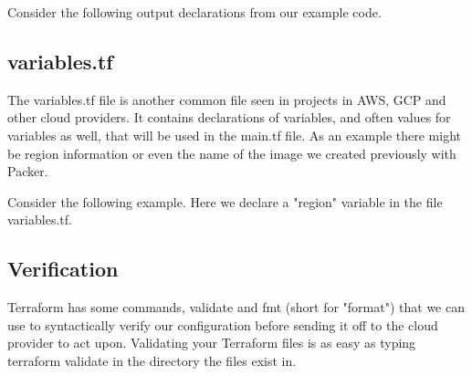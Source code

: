 \justify
Consider the following output declarations from our example code.

\begin{Shaded}
   \begin{Highlighting}[]
       \NormalTok{ \{}
      \NormalTok{ = }
      \NormalTok{\}}

       \NormalTok{ \{}
      \NormalTok{ = }
      \NormalTok{\}}
   \end{Highlighting}
\end{Shaded}


\subsection{variables.tf}

\justify
The variables.tf file is another common file seen in projects in AWS,
GCP and other cloud providers. It contains declarations of variables,
and often values for variables as well, that will be used in the main.tf
file. As an example there might be region information or even the name
of the image we created previously with Packer.

\justify
Consider the following example. Here we declare a "region" variable in
the file variables.tf.

\begin{Shaded}
   \begin{Highlighting}[]
       \NormalTok{ \{}
      \NormalTok{ = }
      \NormalTok{     = }
      \NormalTok{\}}
   \end{Highlighting}
\end{Shaded}


\subsection{Verification}

\justify
Terraform has some commands, validate and fmt (short for "format") that
we can use to syntactically verify our configuration before sending it
off to the cloud provider to act upon. Validating your Terraform files
is as easy as typing terraform validate in the directory the files exist
in.

